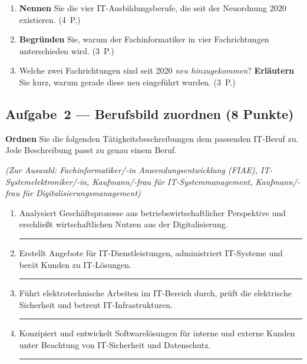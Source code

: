 \documentclass[11pt, a4paper]{article}
\begin{document}
\begin{enumerate}[label=(\alph*)]
  \item \textbf{Nennen} Sie die vier IT-Ausbildungsberufe, die seit der Neuordnung 2020 existieren. \hfill (4~P.)

  \vspace{3cm}

  \item \textbf{Begründen} Sie, warum der Fachinformatiker in vier Fachrichtungen unterschieden wird. \hfill (3~P.)

  \vspace{3cm}

  \item Welche zwei Fachrichtungen sind seit 2020 \emph{neu hinzugekommen}? \textbf{Erläutern} Sie kurz, warum gerade diese neu eingeführt wurden. \hfill (3~P.)

  \vspace{3cm}
\end{enumerate}

\subsection*{Aufgabe~2 --- Berufsbild zuordnen (8 Punkte)}

\textbf{Ordnen} Sie die folgenden Tätigkeitsbeschreibungen dem passenden IT-Beruf zu.
Jede Beschreibung passt zu genau einem Beruf.

\textit{(Zur Auswahl: Fachinformatiker/-in Anwendungsentwicklung (FIAE), IT-Systemelektroniker/-in,
Kaufmann/-frau für IT-Systemmanagement, Kaufmann/-frau für Digitalisierungsmanagement)}

\begin{enumerate}[label=(\alph*)]
  \item Analysiert Geschäftsprozesse aus betriebswirtschaftlicher Perspektive und erschließt wirtschaftlichen Nutzen aus der Digitalisierung.

  \noindent\rule{\linewidth}{0.3pt}

  \item Erstellt Angebote für IT-Dienstleistungen, administriert IT-Systeme und berät Kunden zu IT-Lösungen.

  \noindent\rule{\linewidth}{0.3pt}

  \item Führt elektrotechnische Arbeiten im IT-Bereich durch, prüft die elektrische Sicherheit und betreut IT-Infrastrukturen.

  \noindent\rule{\linewidth}{0.3pt}

  \item Konzipiert und entwickelt Softwarelösungen für interne und externe Kunden unter Beachtung von IT-Sicherheit und Datenschutz.

  \noindent\rule{\linewidth}{0.3pt}
\end{enumerate}
\end{document}
